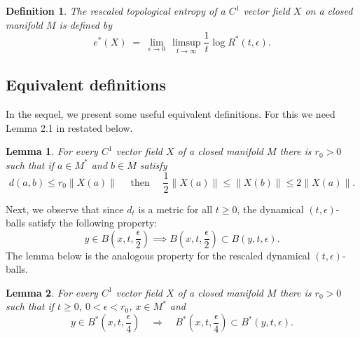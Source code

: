 \documentclass{amsart}
\newtheorem{lem}{Lemma}
\newtheorem{definition}{Definition}
\numberwithin{equation}{section}
\begin{document}
\begin{definition}
\label{dino}
The \emph{rescaled topological entropy} of a \(C^1\) vector field \(X\) on a closed manifold \(M\) is defined by
\[
e^*(X)
\;=\;
\lim_{\epsilon \to 0}\,\limsup_{t \to \infty}
\frac{1}{t} \log R^*(t,\epsilon).
\]
\end{definition}


\subsection{Equivalent definitions}
In the sequel, we present some useful equivalent definitions.
For this we need Lemma 2.1 in \cite{wy} restated below.

\begin{lem}
\label{wendy}
For every $C^1$ vector field $X$ of a closed manifold $M$ there is $r_0>0$ such that
if $a\in M^*$ and $b\in M$ satisfy
\begin{equation}
\label{metanfeta}
d(a,b)\leq r_0\|X(a)\|\quad\mbox{ then }\quad \frac{1}2\|X(a)\|\leq \|X(b)\|\leq 2\|X(a)\|.
\end{equation}
\end{lem}

Next, we observe that since $d_t$ is a metric for all $t\geq0$, the dynamical $(t,\epsilon)$-balls satisfy the following property:
$$
y\in B(x,t,\frac{\epsilon}2)\implies B(x,t,\frac{\epsilon}2)\subset B(y,t,\epsilon).
$$
The lemma below is the analogous property for the rescaled dynamical $(t,\epsilon)$-balls.

\begin{lem}
\label{symmetry}
For every $C^1$ vector field $X$ of a closed manifold $M$
there is $r_0>0$ such that if $t\geq0$, $0<\epsilon<r_0$, $x\in M^*$ and
$$
y\in B^*(x,t,\frac{\epsilon}4)\quad\Longrightarrow\quad
B^*(x,t,\frac{\epsilon}4)\subset B^*(y,t,\epsilon).
$$
\end{lem}
\end{document}
